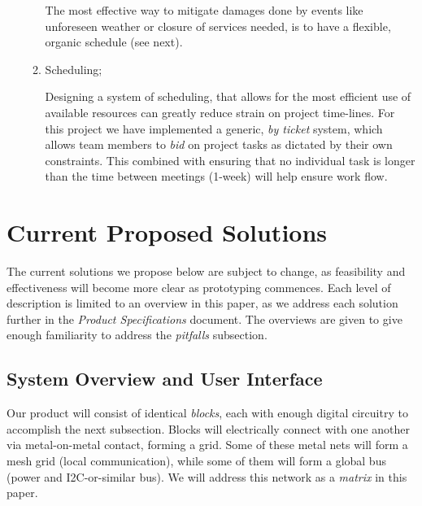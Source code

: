 \begin{enumerate}
\begin{enumerate}
  The most effective way to mitigate damages done by events like unforeseen weather or closure of services needed, is to have a flexible, organic schedule (see next).
  \item Scheduling;

  Designing a system of scheduling, that allows for the most efficient use of available resources can greatly reduce strain on project time-lines. For this project we have implemented a generic, \textit{by ticket} system, which allows team members to \textit{bid} on project tasks as dictated by their own constraints. This combined with ensuring that no individual task is longer than the time between meetings (1-week) will help ensure work flow.
  \end{enumerate}
  \end{enumerate}

\section{Current Proposed Solutions }
  The current solutions we propose below are subject to change, as feasibility and effectiveness will become more clear as prototyping commences. Each level of description is limited to an overview in this paper, as we address each solution further in the \textit{Product  Specifications} document. The overviews are given to give enough familiarity to address the \textit{pitfalls} subsection.

\subsection{System Overview and User Interface}
 Our product will consist of identical \textit{blocks}, each with enough digital circuitry to accomplish the next subsection. Blocks will electrically connect with one another via metal-on-metal contact, forming a grid. Some of these metal nets will form a mesh grid (local communication), while some of them will form a global bus (power and I2C-or-similar bus). We will address this network as a \textit{matrix} in this paper.

